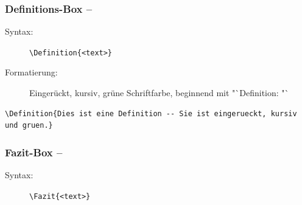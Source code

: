 \documentclass[ngerman,paper=a4,fontsize=8pt,headings=small,draft=no,parskip=half,noonelinecaption]{scrreprt}
\begin{document}
\subsubsection{Definitions-Box -- }

\begin{description}
    \item[Syntax:] \lstinline$\Definition{<text>}$
    
    \item[Formatierung:] Eingerückt, kursiv, grüne Schriftfarbe, beginnend mit
    "`Definition: "`
\end{description}

\begin{lstlisting}
\Definition{Dies ist eine Definition -- Sie ist eingerueckt, kursiv und gruen.}
\end{lstlisting}






\subsubsection{Fazit-Box -- }

\begin{description}
    \item[Syntax:] \lstinline$\Fazit{<text>}$
%     
\end{description}
\end{document}
